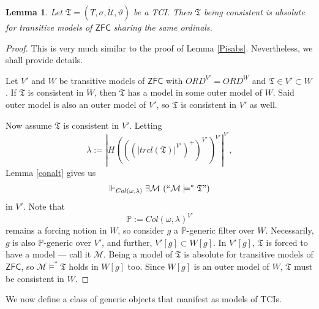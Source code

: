 \documentclass[12pt, twoside]{memoir}
\numberwithin{equation}{section}
\newtheorem{lem}[thm]{Lemma}
\theoremstyle{definition}
\theoremstyle{remark}
\theoremstyle{definition}
\theoremstyle{definition}
\theoremstyle{definition}
\theoremstyle{remark}
\begin{document}
\begin{lem}
Let $\mathfrak{T} = (T, \sigma, \dot{\mathcal{U}}, \vartheta)$ be a TCI. Then $\mathfrak{T}$ being consistent is absolute for transitive models of $\mathsf{ZFC}$ sharing the same ordinals.
\end{lem}

\begin{proof}
This is very much similar to the proof of Lemma \ref{Pisabs}. Nevertheless, we shall provide details. 

Let $V'$ and $W$ be transitive models of $\mathsf{ZFC}$ with $ORD^{V'} = ORD^W$ and $\mathfrak{T} \in V' \subset W$. If $\mathfrak{T}$ is consistent in $W$, then $\mathfrak{T}$ has a model in some outer model of $W$. Said outer model is also an outer model of $V'$, so $\mathfrak{T}$ is consistent in $V'$ as well.

Now assume $\mathfrak{T}$ is consistent in $V'$. Letting $$\lambda := |H(((|trcl(\mathfrak{T})|^{V'})^+)^{V'})^{V'}|^{V'},$$ Lemma \ref{conalt} gives us $$\Vdash_{Col(\omega, \lambda)} \exists \mathcal{M} \ (``\mathcal{M} \models^* \mathfrak{T}")$$ in $V'$. Note that $$\mathbb{P} := Col(\omega, \lambda)^{V'}$$ remains a forcing notion in $W$, so consider $g$ a $\mathbb{P}$-generic filter over $W$. Necessarily, $g$ is also $\mathbb{P}$-generic over $V'$, and further, $V'[g] \subset W[g]$. In $V'[g]$, $\mathfrak{T}$ is forced to have a model --- call it $\mathcal{M}$. Being a model of $\mathfrak{T}$ is absolute for transitive models of $\mathsf{ZFC}$, so $\mathcal{M} \models^* \mathfrak{T}$ holds in $W[g]$ too. Since $W[g]$ is an outer model of $W$, $\mathfrak{T}$ must be consistent in $W$.
\end{proof}

We now define a class of generic objects that manifest as models of TCIs.
\end{document}
